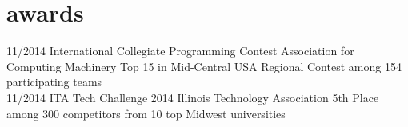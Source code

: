 \section{awards}

\begin{entrylist}
\entry
{11/2014}
{International Collegiate Programming Contest}
{Association for Computing Machinery}
{Top 15 in Mid-Central USA Regional Contest among 154 participating teams \\}
\entry
{11/2014}
{ITA Tech Challenge 2014}
{Illinois Technology Association}
{5th Place among 300 competitors from 10 top Midwest universities}
\end{entrylist}


